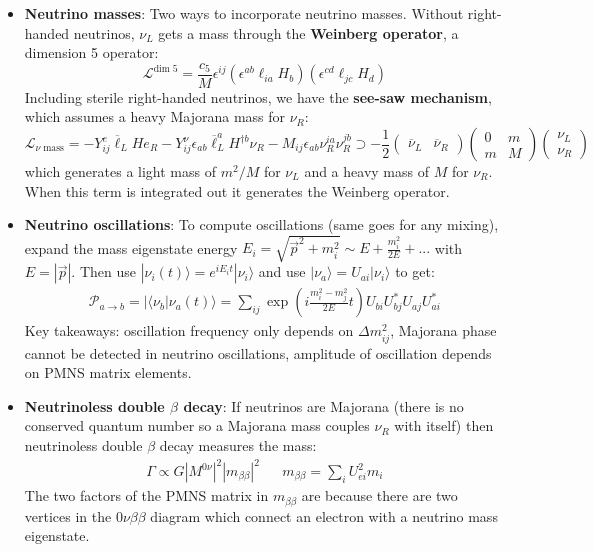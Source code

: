 \documentclass[11pt, oneside]{article}   	%
\theoremstyle{definition}
\numberwithin{equation}{subsection}		%
\begin{document}
\begin{itemize}
	\item \textbf{Neutrino masses}: Two ways to incorporate neutrino masses. Without right-handed neutrinos, $\nu_L$ gets a mass through the \textbf{Weinberg operator}, a 
	dimension 5 operator:
	\begin{equation}
		\mathcal L^{\mathrm{dim}\;5} = \frac{c_5}{M} \epsilon^{ij} (\epsilon^{ab} \ell_{ia} H_b)(\epsilon^{cd} \ell_{jc} H_d)
	\end{equation}
	Including sterile right-handed neutrinos, we have the \textbf{see-saw mechanism}, which assumes a heavy Majorana mass for $\nu_R$:
	\begin{equation}
		\mathcal L_{\nu\;\mathrm{mass}} = -Y_{ij}^e \overline \ell_L H e_R - Y_{ij}^\nu \epsilon_{ab}  \overline\ell_L^a H^{\dagger b} \nu_R - M_{ij}\epsilon_{ab} \nu_R^{ia}\nu_R^{jb}
		\supset -\frac{1}{2}\begin{pmatrix} \overline\nu_L & \overline\nu_R \end{pmatrix} \begin{pmatrix} 0 & m \\ m & M\end{pmatrix} \begin{pmatrix} \nu_L \\ \nu_R \end{pmatrix}
	\end{equation}
	which generates a light mass of $m^2 / M$ for $\nu_L$ and a heavy mass of $M$ for $\nu_R$. When this term is integrated out it generates the Weinberg operator.
	
	\item \textbf{Neutrino oscillations}: To compute oscillations (same goes for any mixing), expand the mass eigenstate energy 
	$E_i = \sqrt{\vec p^2 + m_i^2}\sim E + \frac{m_i^2}{2 E} + ...$ with $E = |\vec p|$. Then use $|\nu_i(t)\rangle = e^{i E_i t} 
	|\nu_i\rangle$ and use $|\nu_a\rangle = U_{ai} |\nu_i\rangle$ to get:
	\begin{align}
		\mathcal P_{a\rightarrow b} = |\langle \nu_b | \nu_a(t)\rangle = \sum_{ij} \exp\left(i\frac{m_i^2 - m_j^2}{2 E} t\right) U_{bi} 
		U_{bj}^* U_{aj} U_{ai}^*
	\end{align}
	Key takeaways: oscillation frequency only depends on $\Delta m_{ij}^2$, Majorana phase cannot be detected in neutrino oscillations, 
	amplitude of oscillation depends on PMNS matrix elements. 
	
	\item \textbf{Neutrinoless double $\beta$ decay}: If neutrinos are Majorana (there is no conserved quantum number so a Majorana mass couples 
	$\nu_R$ with itself) then neutrinoless double $\beta$ decay measures the mass:
	\begin{align}
		\Gamma\propto G |M^{0\nu}|^2 |m_{\beta\beta}|^2 && m_{\beta\beta} = \sum_i U_{ei}^2 m_i
	\end{align}
	The two factors of the PMNS matrix in $m_{\beta\beta}$ are because there are two vertices in the $0\nu\beta\beta$ diagram which connect an 
	electron with a neutrino mass eigenstate. 
	

\end{itemize}
\end{document}

